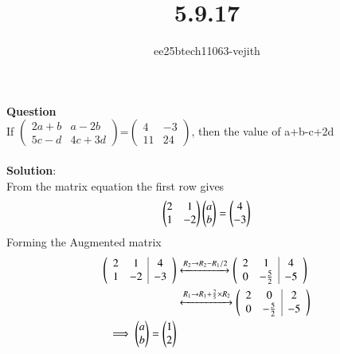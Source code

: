 \documentclass[journal]{IEEEtran}
\begin{document}

\vspace{3cm}

\title{5.9.17}
\author{ee25btech11063-vejith}

\maketitle
{\let\newpage\relax\maketitle}
\renewcommand{\thefigure}{\theenumi}
\renewcommand{\thetable}{\theenumi}
\setlength{\intextsep}{10pt} %
\textbf{Question}\\
If   $\begin{pmatrix}
    2a+b & a-2b\\
    5c-d & 4c+3d
\end{pmatrix}$=$\begin{pmatrix}
    4 & -3\\
    11 & 24
\end{pmatrix}$, then the value of a+b-c+2d\\ \\
\textbf{Solution}:\\
From the matrix equation the first row gives
\begin{align}
    \begin{pmatrix}
        2 & 1\\
        1 & -2
    \end{pmatrix} \begin{pmatrix}a\\b\end{pmatrix}=\begin{pmatrix}4\\-3\end{pmatrix}
    \end{align}
    Forming the Augmented matrix
    \begin{align}
       \left(\begin{array}{cc|c}
        2 & 1 & 4\\
        1 & -2 & -3
\end{array}\right) &\xleftrightarrow{R_2 \rightarrow R_2-R_1/2}
\left(\begin{array}{cc|c} 
        2 & 1 & 4\\
        0 & -\frac{5}{2} & -5
\end{array}\right) \\
&\xleftrightarrow{R_1 \rightarrow R_1+\frac{2}{5}\times R_2} \left(\begin{array}{cc|c}
        2 & 0 & 2\\
        0 & -\frac{5}{2} & -5
\end{array}\right)\\
\implies \begin{pmatrix}a\\b\end{pmatrix}=\begin{pmatrix}1\\2\end{pmatrix}
    \end{align}
\end{document}
